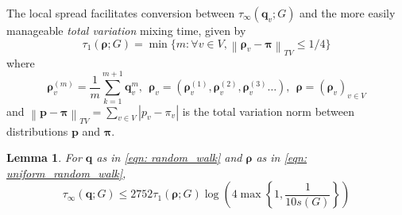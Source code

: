 \documentclass{article}
\newcommand{\abs}[1]{\left \lvert #1 \right \rvert}
\newcommand{\norm}[1]{\left\lVert#1\right\rVert}
\newcommand{\1}{\mathbf{1}}
\newcommand{\pbf}{\mathbf{p}}
\newcommand{\qbf}{\mathbf{q}}
\newcommand{\pibf}{\bm{\pi}}
\newcommand{\rhobf}{\bm{\rho}}
\theoremstyle{aldenthm}
\newtheorem{lemma}{Lemma}
\begin{document}
The local spread facilitates conversion between $\tau_{\infty}(\qbf_v; G)$ and the more easily manageable \emph{total variation} mixing time, given by
\begin{equation*}
\tau_1(\rhobf; G) = \min\biggl\{m: \forall v \in V, \norm{\rhobf_v - \pibf}_{TV} \leq 1/4 \biggr\}
\end{equation*}
where 
\begin{equation}
\label{eqn: uniform_random_walk}
\rhobf_{v}^{(m)} = \frac{1}{m}\sum_{k = 1}^{m+1} \qbf_{v}^{m}, ~~ \rhobf_v = \left( \rhobf_{v}^{(1)}, \rhobf_{v}^{(2)}, \rhobf_{v}^{(3)} \ldots \right), ~~ \rhobf = \left( \rhobf_v \right)_{v \in V}
\end{equation}
and $\norm{\pbf - \pibf}_{TV} = \sum_{v \in V}\abs{p_v - \pi_v}$ is the total variation norm between distributions $\pbf$ and $\pibf$. 
\begin{lemma}
	\label{lem: tv_mixing_to_pointwise_mixing1}
	For $\qbf$ as in \eqref{eqn: random_walk} and $\rhobf$ as in \eqref{eqn: uniform_random_walk},
	\begin{equation*}
	\tau_{\infty}(\qbf; G) \leq 2752 \tau_1(\rhobf; G) \log \left(4 \max\left\{1, \frac{1}{10 s(G)}\right\}\right)
	\end{equation*}
\end{lemma}
\end{document}

